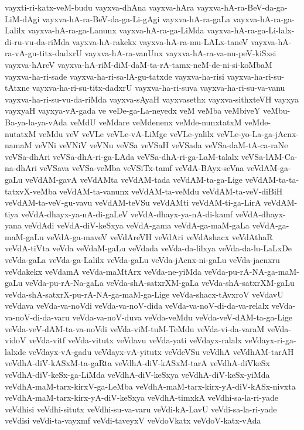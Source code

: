 {vayxti-ri-katx-veM-budu
vayxva-dhAna
vayxva-hAra
vayxva-hA-ra-BeV-da-ga-LiM-dAgi
vayxva-hA-ra-BeV-da-ga-Li-gAgi
vayxva-hA-ra-gaLa
vayxva-hA-ra-ga-Lalilx
vayxva-hA-ra-ga-Lanunx
vayxva-hA-ra-ga-LiMda
vayxva-hA-ra-ga-Li-lalx-di-ru-vu-da-riMda
vayxva-hA-rakekx
vayxva-hA-ra-mu-LALx-taneV
vayxva-hA-ra-vA-gu-titx-dadxrU
vayxva-hA-ra-vanUnx
vayxva-hA-ra-va-nu-peV-kiSxsi
vayxva-hAreV
vayxva-hA-riM-diM-daM-ta-rA-tamx-neM-de-ni-si-koMbaM
vayxva-ha-ri-sade
vayxva-ha-ri-sa-lA-gu-tatxde
vayxva-ha-risi
vayxva-ha-ri-su-tAtxne
vayxva-ha-ri-su-titx-dadxrU
vayxva-ha-ri-suva
vayxva-ha-ri-su-va-vanu
vayxva-ha-ri-su-vu-da-riMda
vayxva-sAyaH
vayxvasethx
vayxva-sithxteVH
vayxya
vayxyaH
vayxya-vA-gada
ve
veDe-ga-La-neyedx
veM
veMba
veMbiveY
veMbu-Ba-ya-la-ya-vAda
veMdU
veMdare
veMdenenx
veMde-nunxtatxM
veMde-nutatxM
veMdu
veV
veVLe
veVLe-vA-LiMge
veVLe-yalilx
veVLe-yo-La-ga-jAcnx-namaM
veVNi
veVNiV
veVNu
veVSa
veVSaH
veVSada
veVSa-daM-tA-ca-raNe
veVSa-dhAri
veVSa-dhA-ri-ga-LAda
veVSa-dhA-ri-ga-LaM-talalx
veVSa-lAM-Ca-na-dhAri
veVSava
veVSa-veMba
veVSiTx-tamf
veVdA-BAyx-seVna
veVdAM-ga-gaLu
veVdAM-gavA
veVdAMta
veVdAM-tada
veVdAM-ta-ga-Lige
veVdAM-ta-ta-tatxvX-veMba
veVdAM-ta-vanunx
veVdAM-ta-veMdu
veVdAM-ta-veV-diBiH
veVdAM-ta-veV-gu-vavu
veVdAM-teVSu
veVdAMti
veVdAM-ti-ga-LirA
veVdAM-tiya
veVdA-dhayx-ya-nA-di-gaLeV
veVdA-dhayx-ya-nA-di-kamf
veVdA-dhayx-yana
veVdAdi
veVdA-diV-keSxya
veVdA-gama
veVdA-ga-maM-gaLa
veVdA-ga-maM-gaLu
veVdA-ga-maveV
veVdAreVH
veVdAri
veVdAshacx
veVdAthaR
veVdA-tiVta
veVda
veVdaM-gaLu
veVdada
veVda-da-lilxya
veVda-da-lu-LaLxDe
veVda-gaLa
veVda-ga-Lalilx
veVda-gaLu
veVda-jAcnx-ni-gaLu
veVda-jacnxru
veVdakekx
veVdamA
veVda-maMtArx
veVda-ne-yiMda
veVda-pu-rA-NA-ga-maM-gaLu
veVda-pu-rA-Na-gaLa
veVda-shA-satxrXM-gaLa
veVda-shA-satxrXM-gaLu
veVda-shA-satxrX-pu-rA-NA-ga-maM-ga-Lige
veVda-shacx-tAvxroV
veVdavU
veVdava
veVda-va-noVdi
veVda-va-noV-dida
veVda-va-noV-di-da-va-relalx
veVda-va-noV-di-da-varu
veVda-va-noV-duva
veVda-veMdu
veVda-veV-dAM-ta-ga-Lige
veVda-veV-dAM-ta-va-noVdi
veVda-viM-tuM-TeMdu
veVda-vi-da-varaM
veVda-vidoV
veVda-vitf
veVda-vitutx
veVdavu
veVda-yati
veVdayx-ralalx
veVdayx-ri-ga-lalxde
veVdayx-vA-gadu
veVdayx-vA-yitutx
veVdeVSu
veVdhA
veVdhAM-tarAH
veVdhA-diV-kASxM-ta-gaRta
veVdhA-diV-kASxM-tarA
veVdhA-diVkeSx
veVdhA-diV-keSx-ga-LiMda
veVdhA-diV-keSxya
veVdhA-diV-keSx-yiMda
veVdhA-maM-tarx-kirxV-ga-LeMba
veVdhA-maM-tarx-kirx-yA-diV-kASx-nivxta
veVdhA-maM-tarx-kirx-yA-diV-keSxya
veVdhA-timxkA
veVdhi-sa-la-ri-yade
veVdhisi
veVdhi-situtx
veVdhi-su-va-varu
veVdi-kA-LavU
veVdi-sa-la-ri-yade
veVdisi
veVdi-ta-vayxmf
veVdi-taveyxV
veVdoVkatx
veVdoV-katx-vAda
}
